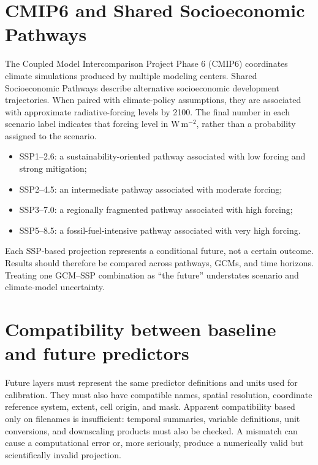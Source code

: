 \section{CMIP6 and Shared Socioeconomic Pathways}

The Coupled Model Intercomparison Project Phase 6 (CMIP6) coordinates climate simulations produced by multiple modeling centers. Shared Socioeconomic Pathways describe alternative socioeconomic development trajectories. When paired with climate-policy assumptions, they are associated with approximate radiative-forcing levels by 2100. The final number in each scenario label indicates that forcing level in W\,m\(^{-2}\), rather than a probability assigned to the scenario.

\begin{itemize}
\item SSP1--2.6: a sustainability-oriented pathway associated with low forcing and strong mitigation;
\item SSP2--4.5: an intermediate pathway associated with moderate forcing;
\item SSP3--7.0: a regionally fragmented pathway associated with high forcing;
\item SSP5--8.5: a fossil-fuel-intensive pathway associated with very high forcing.
\end{itemize}

\begin{atencao}[title={\faExclamationTriangle\quad A scenario is not a unique forecast}]
Each SSP-based projection represents a conditional future, not a certain outcome. Results should therefore be compared across pathways, GCMs, and time horizons. Treating one GCM--SSP combination as ``the future'' understates scenario and climate-model uncertainty.
\end{atencao}

\section{Compatibility between baseline and future predictors}

Future layers must represent the same predictor definitions and units used for calibration. They must also have compatible names, spatial resolution, coordinate reference system, extent, cell origin, and mask. Apparent compatibility based only on filenames is insufficient: temporal summaries, variable definitions, unit conversions, and downscaling products must also be checked. A mismatch can cause a computational error or, more seriously, produce a numerically valid but scientifically invalid projection.


